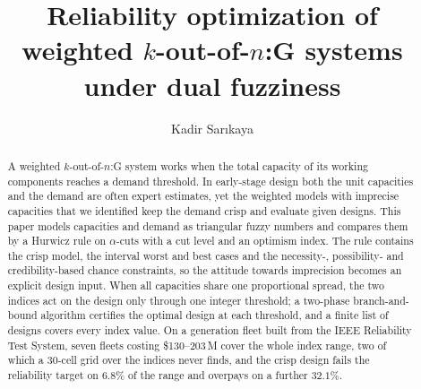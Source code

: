 \documentclass[Review,sagev,times]{sagej}%
\begin{document}

\title{Reliability optimization of weighted $k$-out-of-$n$:G systems under dual fuzziness}

\author{Kadir Sar\i kaya}




\begin{abstract}
A weighted $k$-out-of-$n$:G system works when the total capacity of its working components reaches a demand
threshold. In early-stage design both the unit capacities and the demand are often expert estimates, yet the
weighted models with imprecise capacities that we identified keep the demand crisp and evaluate given designs. This paper models capacities and demand as triangular fuzzy numbers and compares them by a
Hurwicz rule on $\alpha$-cuts with a cut level and an optimism index. The rule contains the crisp model, the
interval worst and best cases and the necessity-, possibility- and credibility-based chance constraints, so
the attitude towards imprecision becomes an explicit design input. When all capacities share one proportional
spread, the two indices act on the design only through one integer threshold; a two-phase branch-and-bound
algorithm certifies the optimal design at each threshold, and a finite list of designs covers every index value.
On a generation fleet built from the IEEE Reliability Test System, seven fleets costing \$130--203\,M cover the
whole index range, two of which a $30$-cell grid over the indices never finds, and the crisp design fails the
reliability target on $6.8\%$ of the range and overpays on a further $32.1\%$.
\end{abstract}


\maketitle

\linenumbers
\end{document}
